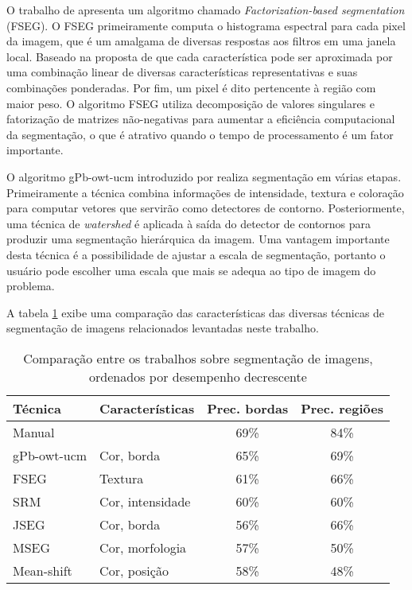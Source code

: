 O trabalho de  apresenta um algoritmo chamado \textit{Factorization-based segmentation} (FSEG). O FSEG primeiramente computa o histograma espectral para cada pixel da imagem, que é um amalgama de diversas respostas aos filtros em uma janela local. Baseado na proposta de que cada característica pode ser aproximada por uma combinação linear de diversas características representativas e suas combinações ponderadas. Por fim, um pixel é dito pertencente à região com maior peso. O algoritmo FSEG utiliza decomposição de valores singulares e fatorização de matrizes não-negativas para aumentar a eficiência computacional da segmentação, o que é atrativo quando o tempo de processamento é um fator importante.

O algoritmo gPb-owt-ucm introduzido por  realiza segmentação em várias etapas. Primeiramente a técnica combina informações de intensidade, textura e coloração para computar vetores que servirão como  detectores de contorno. Posteriormente, uma técnica de \textit{watershed} é aplicada à saída do detector de contornos para produzir uma segmentação hierárquica da imagem. Uma vantagem importante desta técnica é a possibilidade de ajustar a escala de segmentação, portanto o usuário pode escolher uma escala que mais se adequa ao tipo de imagem do problema.

A tabela \ref{tab:sumarioSegmentacao} exibe uma comparação das características das diversas técnicas de segmentação de imagens relacionados levantadas neste trabalho.

\begin{table}[h]
\centering
\begin{tabular}{|l|l|c|c|}
\hline
\textbf{Técnica} & \textbf{Características} & \textbf{Prec. bordas} & \textbf{Prec. regiões } \\ \hline
Manual      &                  & 69\% & 84\% \\ \hline
gPb-owt-ucm & Cor, borda       & 65\% & 69\% \\ \hline
FSEG        & Textura          & 61\% & 66\% \\ \hline
SRM         & Cor, intensidade & 60\% & 60\% \\ \hline
JSEG        & Cor, borda       & 56\% & 66\% \\ \hline
MSEG        & Cor, morfologia  & 57\% & 50\% \\ \hline
Mean-shift  & Cor, posição     & 58\% & 48\% \\ \hline
\end{tabular}
\caption{Comparação entre os trabalhos sobre segmentação de imagens, ordenados por desempenho decrescente}
\label{tab:sumarioSegmentacao}
\end{table}

